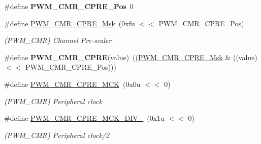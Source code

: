 \begin{DoxyCompactItemize}
\item 
\mbox{\label{group__SAMS70__PWM_ga5badf58a9dad60e51cc93b3bd3b50857}} 
\#define {\bfseries P\+W\+M\+\_\+\+C\+M\+R\+\_\+\+C\+P\+R\+E\+\_\+\+Pos}~0
\item 
\mbox{\label{group__SAMS70__PWM_gaa7cd448e4b8d4338768b6d3c01087a35}} 
\#define \mbox{\hyperlink{group__SAMS70__PWM_gaa7cd448e4b8d4338768b6d3c01087a35}{P\+W\+M\+\_\+\+C\+M\+R\+\_\+\+C\+P\+R\+E\+\_\+\+Msk}}~(0xfu $<$$<$ P\+W\+M\+\_\+\+C\+M\+R\+\_\+\+C\+P\+R\+E\+\_\+\+Pos)
\begin{DoxyCompactList}\small\item\em (P\+W\+M\+\_\+\+C\+MR) Channel Pre-\/scaler \end{DoxyCompactList}\item 
\mbox{\label{group__SAMS70__PWM_gae06e7defd2dba13c0fff86d6496e86bd}} 
\#define {\bfseries P\+W\+M\+\_\+\+C\+M\+R\+\_\+\+C\+P\+RE}(value)~((\mbox{\hyperlink{group__SAMV71__PWM_gaa7cd448e4b8d4338768b6d3c01087a35}{P\+W\+M\+\_\+\+C\+M\+R\+\_\+\+C\+P\+R\+E\+\_\+\+Msk}} \& ((value) $<$$<$ P\+W\+M\+\_\+\+C\+M\+R\+\_\+\+C\+P\+R\+E\+\_\+\+Pos)))
\item 
\mbox{\label{group__SAMS70__PWM_ga5d3f3920d928ba2aa52de186a445d0f4}} 
\#define \mbox{\hyperlink{group__SAMS70__PWM_ga5d3f3920d928ba2aa52de186a445d0f4}{P\+W\+M\+\_\+\+C\+M\+R\+\_\+\+C\+P\+R\+E\+\_\+\+M\+CK}}~(0x0u $<$$<$ 0)
\begin{DoxyCompactList}\small\item\em (P\+W\+M\+\_\+\+C\+MR) Peripheral clock \end{DoxyCompactList}\item 
\mbox{\label{group__SAMS70__PWM_ga37ce0b9a18a244345e0bfa53ca090dae}} 
\#define \mbox{\hyperlink{group__SAMS70__PWM_ga37ce0b9a18a244345e0bfa53ca090dae}{P\+W\+M\+\_\+\+C\+M\+R\+\_\+\+C\+P\+R\+E\+\_\+\+M\+C\+K\+\_\+\+D\+I\+V\+\_}}~(0x1u $<$$<$ 0)
\begin{DoxyCompactList}\small\item\em (P\+W\+M\+\_\+\+C\+MR) Peripheral clock/2 \end{DoxyCompactList}\item 
\mbox{\label{group__SAMS70__PWM_gaa64626b14684edb5448046b2ba3ddcdf}} 

\end{DoxyCompactItemize}
